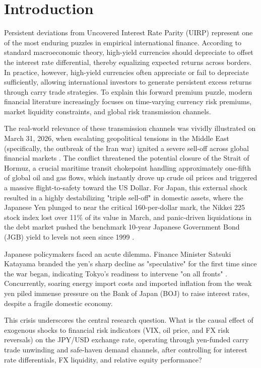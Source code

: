 \documentclass[12pt]{article}
\begin{document}
\newpage
\tableofcontents
\newpage

\section{Introduction}

{} Persistent deviations from Uncovered Interest Rate Parity (UIRP) represent one of the most enduring puzzles in empirical international finance. According to standard macroeconomic theory, high-yield currencies should depreciate to offset the interest rate differential, thereby equalizing expected returns across borders. In practice, however, high-yield currencies often appreciate or fail to depreciate sufficiently, allowing international investors to generate persistent excess returns through carry trade strategies. To explain this forward premium puzzle, modern financial literature increasingly focuses on time-varying currency risk premiums, market liquidity constraints, and global risk transmission channels.

{} The real-world relevance of these transmission channels was vividly illustrated on March 31, 2026, when escalating geopolitical tensions in the Middle East (specifically, the outbreak of the Iran war) ignited a severe sell-off across global financial markets \parencite{reuters2026japan}. The conflict threatened the potential closure of the Strait of Hormuz, a crucial maritime transit chokepoint handling approximately one-fifth of global oil and gas flows, which instantly drove up crude oil prices and triggered a massive flight-to-safety toward the US Dollar. For Japan, this external shock resulted in a highly destabilizing "triple sell-off" in domestic assets, where the Japanese Yen plunged to near the critical 160-per-dollar mark, the Nikkei 225 stock index lost over 11\% of its value in March, and panic-driven liquidations in the debt market pushed the benchmark 10-year Japanese Government Bond (JGB) yield to levels not seen since 1999 \parencite{reuters2026japan}.

{} Japanese policymakers faced an acute dilemma. Finance Minister Satsuki Katayama branded the yen's sharp decline as "speculative" for the first time since the war began, indicating Tokyo's readiness to intervene "on all fronts" \parencite{reuters2026japan}. Concurrently, soaring energy import costs and imported inflation from the weak yen piled immense pressure on the Bank of Japan (BOJ) to raise interest rates, despite a fragile domestic economy.

{} This crisis underscores the central research question. What is the causal effect of exogenous shocks to financial risk indicators (VIX, oil price, and FX risk reversals) on the JPY/USD exchange rate, operating through yen-funded carry trade unwinding and safe-haven demand channels, after controlling for interest rate differentials, FX liquidity, and relative equity performance?
\end{document}
